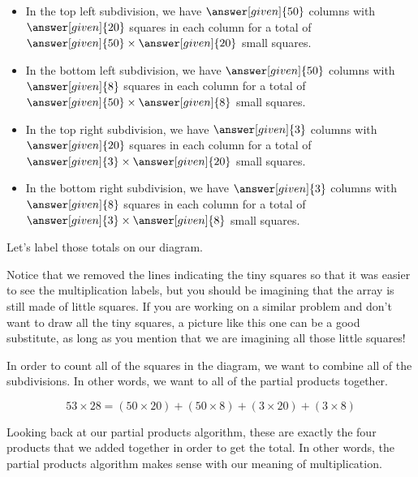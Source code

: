 \documentclass{ximera}
\begin{document}
\begin{explanation}
\begin{itemize}
\item In the top left subdivision, we have $\answer[given]{50}$ columns with $\answer[given]{20}$ squares in each column for a total of $\answer[given]{50} \times \answer[given]{20}$ small squares.
\item In the bottom left subdivision, we have $\answer[given]{50}$ columns with $\answer[given]{8}$ squares in each column for a total of $\answer[given]{50} \times \answer[given]{8}$ small squares.
\item In the top right subdivision, we have $\answer[given]{3}$ columns with $\answer[given]{20}$ squares in each column for a total of $\answer[given]{3} \times \answer[given]{20}$ small squares.
\item In the bottom right subdivision, we have $\answer[given]{3}$ columns with $\answer[given]{8}$ squares in each column for a total of $\answer[given]{3} \times \answer[given]{8}$ small squares.
\end{itemize}

Let's label those totals on our diagram.

\begin{image}
\end{image}
Notice that we removed the lines indicating the tiny squares so that it was easier to see the multiplication labels, but you should be imagining that the array is still made of little squares. If you are working on a similar problem and don't want to draw all the tiny squares, a picture like this one can be a good substitute, as long as you mention that we are imagining all those little squares!

In order to count all of the squares in the diagram, we want to combine all of the subdivisions. In other words, we want to  all of the partial products together. 

\[
53 \times 28 = (50 \times 20) + (50 \times 8) + (3 \times 20) + (3 \times 8)
\]

Looking back at our partial products algorithm, these are exactly the four products that we added together in order to get the total. In other words, the partial products algorithm makes sense with our meaning of multiplication.

\end{explanation}
\end{document}
